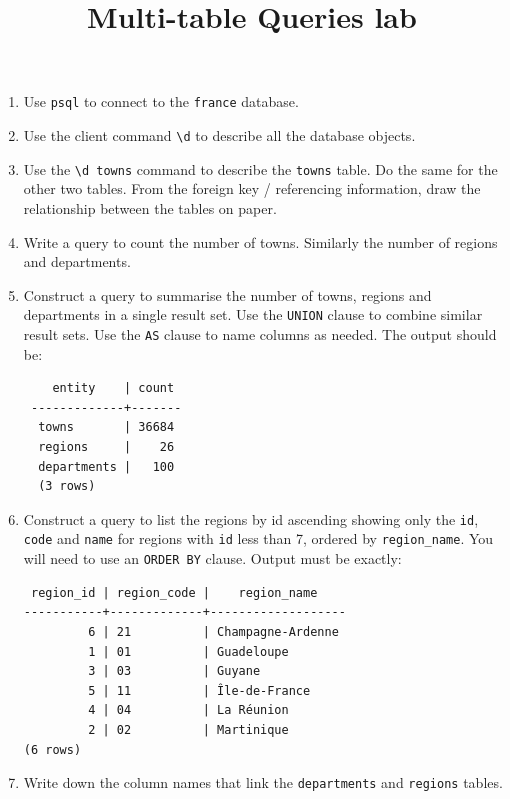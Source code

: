 \documentclass{pgnotes}
\title{Multi-table Queries lab}
\begin{document}
\maketitle

\begin{enumerate}

\item Use \texttt{psql} to connect to the \texttt{france} database.

\item Use the client command \texttt{\textbackslash d} to describe all the database objects.

\item Use the \texttt{\textbackslash d towns} command to describe the \texttt{towns} table.
  Do the same for the other two tables.
  From the foreign key / referencing information, draw the relationship between the tables on paper. 

\item Write a query to count the number of towns.
  Similarly the number of regions and departments. 
  
\item Construct a query to summarise the number of towns, regions and departments in a single result set.
  Use the \texttt{UNION} clause to combine similar result sets.
  Use the \texttt{AS} clause to name columns as needed.
  The output should be:
\begin{verbatim}
    entity    | count
 -------------+-------
  towns       | 36684
  regions     |    26
  departments |   100
  (3 rows)
\end{verbatim}

\item Construct a query to list the regions by id ascending showing only the \texttt{id}, \texttt{code} and \texttt{name} for regions with \texttt{id} less than 7, ordered by \texttt{region\_name}.
  You will need to use an \texttt{ORDER BY} clause.
  Output must be exactly:
\begin{verbatim}
 region_id | region_code |    region_name
-----------+-------------+-------------------
         6 | 21          | Champagne-Ardenne
         1 | 01          | Guadeloupe
         3 | 03          | Guyane
         5 | 11          | Île-de-France
         4 | 04          | La Réunion
         2 | 02          | Martinique
(6 rows)
\end{verbatim}
  \label{step:region-list}

\item Write down the column names that link the \texttt{departments} and \texttt{regions} tables.


\end{enumerate}
\end{document}
